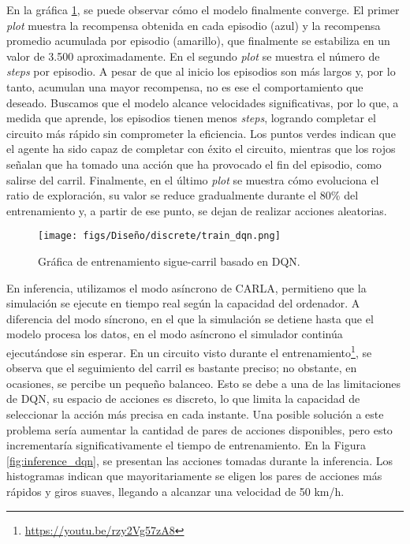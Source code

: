 En la gráfica \ref{fig:train_dqn}, se puede observar cómo el modelo finalmente converge. El primer \textit{plot} muestra la recompensa obtenida en cada episodio (azul) y la recompensa promedio acumulada por episodio (amarillo), que finalmente se estabiliza en un valor de 3.500 aproximadamente. En el segundo \textit{plot} se muestra el número de \textit{steps} por episodio. A pesar de que al inicio los episodios son más largos y, por lo tanto, acumulan una mayor recompensa, no es ese el comportamiento que deseado. Buscamos que el modelo alcance velocidades significativas, por lo que, a medida que aprende, los episodios tienen menos \textit{steps}, logrando completar el circuito más rápido sin comprometer la eficiencia. Los puntos verdes indican que el agente ha sido capaz de completar con éxito el circuito, mientras que los rojos señalan que ha tomado una acción que ha provocado el fin del episodio, como salirse del carril. Finalmente, en el último \textit{plot} se muestra cómo evoluciona el ratio de exploración, su valor se reduce gradualmente durante el 80\% del entrenamiento y, a partir de ese punto, se dejan de realizar acciones aleatorias.
\begin{figure}[ht]
\centering
\texttt{[image: figs/Diseño/discrete/train\_dqn.png]}
\caption{Gráfica de entrenamiento sigue-carril basado en \ac{DQN}.}
\label{fig:train_dqn}
\end{figure}

En inferencia, utilizamos el modo asíncrono de CARLA, permitieno que la simulación se ejecute en tiempo real según la capacidad del ordenador. A diferencia del modo síncrono, en el que la simulación se detiene hasta que el modelo procesa los datos, en el modo asíncrono el simulador continúa ejecutándose sin esperar. En un circuito visto durante el entrenamiento\footnote{\url{https://youtu.be/rzy2Vg57zA8}}, se observa que el seguimiento del carril es bastante preciso; no obstante, en ocasiones, se percibe un pequeño balanceo. Esto se debe a una de las limitaciones de \ac{DQN}, su espacio de acciones es discreto, lo que limita la capacidad de seleccionar la acción más precisa en cada instante. Una posible solución a este problema sería aumentar la cantidad de pares de acciones disponibles, pero esto incrementaría significativamente el tiempo de entrenamiento. En la Figura \ref{fig:inference_dqn}, se presentan las acciones tomadas durante la inferencia. Los histogramas indican que mayoritariamente se eligen los pares de acciones más rápidos y giros suaves, llegando a alcanzar una velocidad de 50 km/h.

